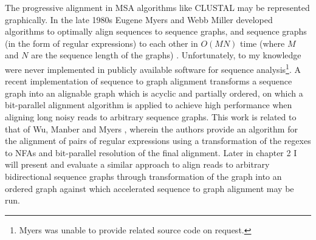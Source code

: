 The progressive alignment in MSA algorithms like CLUSTAL may be represented graphically.
In the late 1980s Eugene Myers and Webb Miller developed algorithms to optimally align sequences to sequence graphs, and sequence graphs (in the form of regular expressions) to each other in $O(MN)$ time (where $M$ and $N$ are the sequence length of the graphs) \cite{myers1989approximate,wu1995subquadratic}.
Unfortunately, to my knowledge were never implemented in publicly available software for sequence analysis\footnote{Myers was unable to provide related source code on request.}.
A recent implementation of sequence to graph alignment \cite{rautiainen2018bit} transforms a sequence graph into an alignable graph which is acyclic and partially ordered, on which a bit-parallel alignment algorithm is applied to achieve high performance when aligning long noisy reads to arbitrary sequence graphs.
This work is related to that of Wu, Manber and Myers \cite{wu1995subquadratic}, wherein the authors provide an algorithm for the alignment of pairs of regular expressions using a transformation of the regexes to NFAs and bit-parallel resolution of the final alignment.
Later in chapter 2 I will present and evaluate a similar approach to align reads to arbitrary bidirectional sequence graphs through transformation of the graph into an ordered graph against which accelerated sequence to graph alignment may be run.

